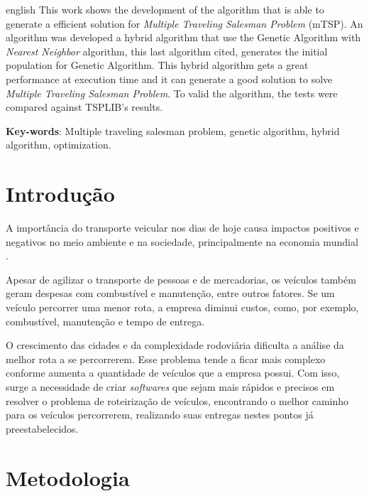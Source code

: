 \documentclass[12pt,openright,a4paper,twoside]{tcc}
\begin{document}
	\begin{resumo}[Abstract]
    	\begin{otherlanguage*}{english}
		This work shows the development of the algorithm that is able to generate a efficient solution for \textit{Multiple Traveling Salesman Problem} (mTSP). An algorithm was developed a hybrid algorithm that use the Genetic Algorithm with \textit{Nearest Neighbor} algorithm, this last algorithm cited, generates the initial population for Genetic Algorithm. This hybrid algorithm gets a great performance at execution time and it can generate a good solution to solve \textit{Multiple Traveling Salesman Problem}. To valid the algorithm, the tests were compared against TSPLIB's results.

        \vspace{\onelineskip}
        \noindent
        \textbf{Key-words}: Multiple traveling salesman problem, genetic algorithm, hybrid algorithm, optimization.
		\end{otherlanguage*}
	\end{resumo}
	
    \textual
	\chapter{Introdução}
		
		A importância do transporte veicular nos dias de hoje causa impactos positivos e negativos 
	    no meio ambiente e na sociedade, principalmente na economia mundial \cite{meioAmbiente}. 
		
		Apesar de agilizar o transporte de pessoas e  de mercadorias, 
		os veículos também geram despesas com combustível e manutenção, entre outros fatores. 
		Se um veículo percorrer uma menor rota, a empresa diminui custos, como, por exemplo, 
		combustível, manutenção e tempo de entrega.

		O crescimento das cidades e da complexidade rodoviária dificulta a análise da melhor rota a se percorrerem. Esse problema tende a ficar mais complexo conforme aumenta a quantidade de veículos que a empresa possui. Com isso, surge a necessidade de criar 
		\textit{softwares} que sejam mais rápidos e precisos em resolver o problema de roteirização de veículos, encontrando o melhor caminho para os veículos percorrerem, realizando suas entregas nestes pontos já preestabelecidos.


	\chapter{Metodologia}
\end{document}
